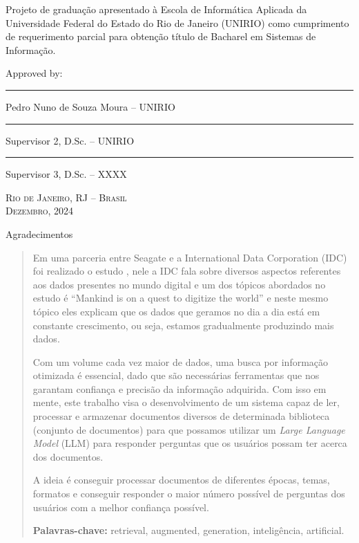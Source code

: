 \documentclass[a4paper, 12pt]{article}
\begin{document}
    \begin{flushright}
        \parbox{8.0cm}{
        Projeto de graduação apresentado à Escola de Informática Aplicada
        da Universidade Federal do Estado do Rio de Janeiro (UNIRIO) como
        cumprimento de requerimento parcial para obtenção título de Bacharel em
        Sistemas de Informação.}
        \vskip 1.5cm
        Approved by:
        \vskip 1.5cm
        \rule{10.0cm}{.1mm}

        Pedro Nuno de Souza Moura -- UNIRIO
        \vskip 1.0cm
        
        \rule{10.0cm}{.1mm}

        Supervisor 2, D.Sc. -- UNIRIO
        \vskip 1.0cm

        \rule{10.0cm}{.1mm}

        Supervisor 3, D.Sc. -- XXXX
        \vskip 1.0cm
    \end{flushright}
    \begin{center}
        \textsc{Rio de Janeiro, RJ -- Brasil} \\ \textsc{Dezembro, 2024}
    \end{center}

    \clearpage
    \begin{flushright}
        Agradecimentos
    \end{flushright}
    \lipsum[1-2]

    \clearpage

    \begin{abstract}
        Em uma parceria entre Seagate e a International Data Corporation (IDC) foi realizado o estudo , nele a IDC fala sobre diversos aspectos referentes aos dados presentes no mundo digital e um dos tópicos abordados no estudo é “Mankind is on a quest to digitize the world” e neste mesmo tópico eles explicam que os dados que geramos no dia a dia está em constante crescimento, ou seja, estamos gradualmente produzindo mais dados.

        Com um volume cada vez maior de dados, uma busca por informação otimizada é essencial, dado que são necessárias ferramentas que nos garantam confiança e precisão da informação adquirida. Com isso em mente, este trabalho visa o desenvolvimento de um sistema capaz de ler, processar e armazenar documentos diversos de determinada biblioteca (conjunto de documentos) para que possamos utilizar um \textit{Large Language Model} (LLM) para responder perguntas que os usuários possam ter acerca dos documentos.
        
        A ideia é conseguir processar documentos de diferentes épocas, temas, formatos e conseguir responder o maior número possível de perguntas dos usuários com a melhor confiança possível.

        \begin{flushleft}
            \textbf{Palavras-chave:} retrieval, augmented, generation, inteligência, artificial.
        \end{flushleft}
    \end{abstract}
    \clearpage
\end{document}
